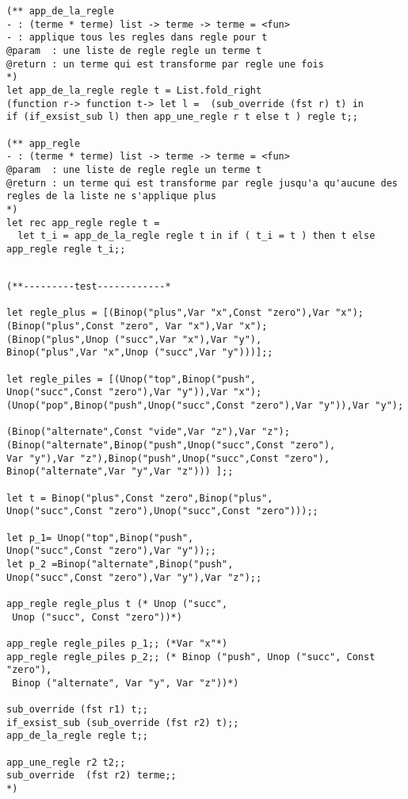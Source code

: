 \documentclass[12pt]{amsart}
\begin{document}
\begin{lstlisting}
(** app_de_la_regle 
- : (terme * terme) list -> terme -> terme = <fun>
- : applique tous les regles dans regle pour t
@param  : une liste de regle regle un terme t
@return : un terme qui est transforme par regle une fois
*)
let app_de_la_regle regle t = List.fold_right
(function r-> function t-> let l =  (sub_override (fst r) t) in
if (if_exsist_sub l) then app_une_regle r t else t ) regle t;; 

(** app_regle 
- : (terme * terme) list -> terme -> terme = <fun>
@param  : une liste de regle regle un terme t
@return : un terme qui est transforme par regle jusqu'a qu'aucune des
regles de la liste ne s'applique plus
*)
let rec app_regle regle t = 
  let t_i = app_de_la_regle regle t in if ( t_i = t ) then t else app_regle regle t_i;;

  \end{lstlisting}  

  \begin{lstlisting}

(**---------test------------*

let regle_plus = [(Binop("plus",Var "x",Const "zero"),Var "x");
(Binop("plus",Const "zero", Var "x"),Var "x");
(Binop("plus",Unop ("succ",Var "x"),Var "y"),
Binop("plus",Var "x",Unop ("succ",Var "y")))];;

let regle_piles = [(Unop("top",Binop("push",
Unop("succ",Const "zero"),Var "y")),Var "x");
(Unop("pop",Binop("push",Unop("succ",Const "zero"),Var "y")),Var "y");

(Binop("alternate",Const "vide",Var "z"),Var "z");
(Binop("alternate",Binop("push",Unop("succ",Const "zero"),
Var "y"),Var "z"),Binop("push",Unop("succ",Const "zero"),
Binop("alternate",Var "y",Var "z"))) ];;

let t = Binop("plus",Const "zero",Binop("plus",
Unop("succ",Const "zero"),Unop("succ",Const "zero")));;

let p_1= Unop("top",Binop("push",
Unop("succ",Const "zero"),Var "y"));;
let p_2 =Binop("alternate",Binop("push",
Unop("succ",Const "zero"),Var "y"),Var "z");;

app_regle regle_plus t (* Unop ("succ",
 Unop ("succ", Const "zero"))*)

app_regle regle_piles p_1;; (*Var "x"*)
app_regle regle_piles p_2;; (* Binop ("push", Unop ("succ", Const "zero"),
 Binop ("alternate", Var "y", Var "z"))*)

sub_override (fst r1) t;;
if_exsist_sub (sub_override (fst r2) t);;
app_de_la_regle regle t;;

app_une_regle r2 t2;;
sub_override  (fst r2) terme;;
*)
  \end{lstlisting}  
  
\end{document}
